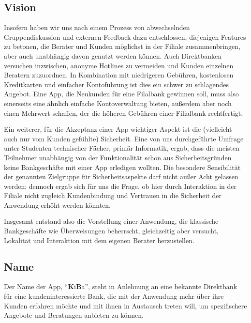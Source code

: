 \subsection{Vision}


Insofern haben wir uns nach einem Prozess von abwechselnden Gruppendiskussion und externen Feedback dazu entschlossen, diejenigen Features zu betonen, die Berater und Kunden möglichst in der Filiale zusammenbringen, aber auch unabhängig davon genutzt werden können. Auch Direktbanken versuchen inzwischen, anonyme Hotlines zu vermeiden und Kunden einzelnen Beratern zuzuordnen. In Kombination mit niedrigeren Gebühren, kostenlosen Kreditkarten und einfacher Kontoführung ist dies ein schwer zu schlagendes Angebot. Eine App, die Neukunden für eine Filalbank gewinnen soll, muss also einerseits eine ähnlich einfache Kontoverwaltung bieten, außerdem aber noch einen Mehrwert schaffen, der die höheren Gebühren einer Filialbank rechtfertigt.

Ein weiterer, für die Akzeptanz einer App wichtiger Aspekt ist die (vielleicht auch nur vom Kunden gefühlte) Sicherheit. Eine von uns durchgeführte Umfrage unter Studenten technischer Fächer, primär Informatik, ergab, dass die meisten Teilnehmer unabhängig von der Funktionalität schon aus Sicherheitsgründen keine Bankgeschäfte mit einer App erledigen wollten. Die besondere Sensibilität der genannten Zielgruppe für Sicherheitsaspekte darf nicht außer Acht gelassen werden; dennoch ergab sich für uns die Frage, ob hier durch Interaktion in der Filiale nicht zugleich Kundenbindung und Vertrauen in die Sicherheit der Anwendung erhöht werden könnten. 

Insgesamt entstand also die Vorstellung einer Anwendung, die klassische Bankgeschäfte wie Überweisungen beherrscht, gleichzeitig aber versucht, Lokalität und Interaktion mit dem eigenen Berater herzustellen. 

\subsection{Name}
    Der Name der App, "`\textbf{K}i\textbf{B}a"', steht in Anlehnung an eine bekannte Direktbank für eine kundeninteressierte Bank, die mit der Anwendung mehr über ihre Kunden erfahren möchte und mit ihnen in Austausch treten will, um spezifischere Angebote und Beratungen anbieten zu können.
    
